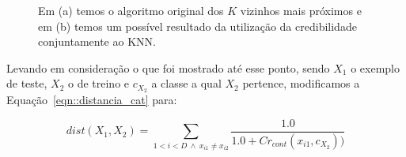 \begin{figure}[ht]
\centering
{}
\caption{Em (a) temos o algoritmo original dos $K$ vizinhos mais próximos e em (b) temos um possível resultado da utilização da credibilidade conjuntamente ao \textsc{KNN}.  
\label{fig::KNNantesedepois}}
\end{figure}

Levando em consideração o que foi mostrado até esse ponto, sendo $X_1$ o exemplo de teste, $X_2$ o de treino e $c_{X_2}$ a classe a qual $X_2$ pertence, modificamos a Equação~\ref{eqn::distancia_cat} para:

\begin{equation} \label{eqn::distancia_cat_cred}
   dist(X_1, X_2) = \sum_{1 < i < D\ \wedge \ x_{i1} \neq x_{i2}} \frac{1.0}{1.0 + Cr_{cont}(x_{i1}, c_{X_2} ))}
\end{equation}

